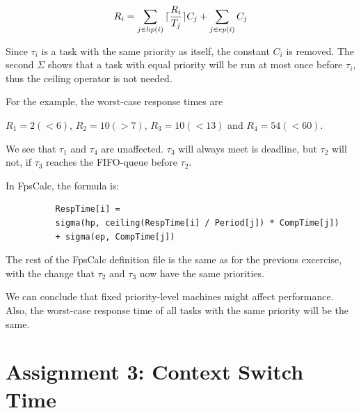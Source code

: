 \documentclass[a4paper,10pt]{article}
\DeclarePairedDelimiter{\ceil}{\lceil}{\rceil}
\begin{document}
\begin{enumerate}
	\begin{equation*}
		R_i = \sum_{j \in hp(i)}{\ceil{\frac{R_i}{T_j}}C_j} + \sum_{j \in ep(i)}{C_j}
	\end{equation*}
	
	Since $\tau_i$ is a task with the same priority as itself, the constant $C_i$ is removed. The second $\Sigma$ shows that a task with equal priority will be run at most once before $\tau_i$, thus the ceiling operator is not needed.
	
	For the example, the worst-case response times are
	
	$R_1 = 2 (< 6)$, $R_2 = 10 (> 7)$, $R_3 = 10 (< 13)$ and $R_4 = 54 (< 60)$.
	
	We see that $\tau_1$ and $\tau_4$ are unaffected. $\tau_3$ will always meet is deadline, but $\tau_2$ will not, if $\tau_3$ reaches the FIFO-queue before $\tau_2$.
	
	In FpsCalc, the formula is:
	
	\begin{lstlisting}
          RespTime[i] =
          sigma(hp, ceiling(RespTime[i] / Period[j]) * CompTime[j])
          + sigma(ep, CompTime[j])
	\end{lstlisting}

        The rest of the FpsCalc definition file is the same as for the previous excercise, with the change that $\tau_2$ and $\tau_3$ now have the same priorities.
	
	We can conclude that fixed priority-level machines might affect performance. Also, the worst-case response time of all tasks with the same priority will be the same.
	
\end{enumerate}

\section{Assignment 3: Context Switch Time}
\end{document}
